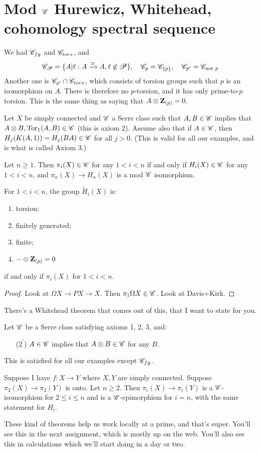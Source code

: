 \section{Mod $\mathscr C$ Hurewicz, Whitehead, cohomology spectral sequence}
We had $\mathscr C_{fg}$ and $\mathscr C_{tors}$, and
$$
\mathscr C_\mathscr P = \{A|\ell:A\xrightarrow{\simeq} A,\ell\not\in\mathscr P\},\quad \mathscr C_p = \mathscr C_{\{p\}},\quad \mathscr C_{p^\prime} = \mathscr C_{\text{not }p}
$$
Another one is $\mathscr C_{p^\prime}\cap \mathscr C_{tors}$, which consists of torsion groups such that $p$ is an isomorphism on $A$.
There is therefore no $p$-torsion, and it has only prime-to-$p$ torsion.
This is the same thing as saying that $A\otimes\mathbf Z_{(p)} = 0$.
\begin{theorem}
    Let $X$ be simply connected and $\mathscr C$ a Serre class such that $A,B\in\mathscr C$ implies that $A\otimes B,\operatorname{Tor}_1(A,B)\in \mathscr C$ (this is axiom 2).
    Assume also that if $A\in\mathscr C$, then $H_j(K(A,1)) = H_j(BA)\in\mathscr C$ for all $j>0$.
    (This is valid for all our examples, and is what is called Axiom 3.)

    Let $n\geq 1$.
    Then $\pi_i(X)\in\mathscr C$ for any $1<i<n$ if and only if $H_i(X)\in\mathscr C$ for any $1<i<n$,
    and $\pi_n(X)\to H_n(X)$ is a mod $\mathscr C$ isomorphism.
\end{theorem}
\begin{example}
    For $1<i<n$, the group $\widetilde{H}_i(X)$ is:
    \begin{enumerate}
	\item torsion;
	\item finitely generated;
	\item finite;
	\item $-\otimes \mathbf Z_{(p)} = 0$
    \end{enumerate}
    if and only if $\pi_i(X)$ for $1<i<n$.
\end{example}
\begin{proof}
    Look at $\Omega X\to PX \to X$.
    Then $\pi_1 \Omega X\in\mathscr C$.
    Look at Davis+Kirk.
\end{proof}
There's a Whitehead theorem that comes out of this, that I want to state for you.
\begin{theorem}
    Let $\mathscr C$ be a Serre class satisfying axioms 1, 2, 3, and:
    \begin{enumerate}
	\item[($2^\prime$)] $A\in\mathscr C$ implies that $A\otimes B\in\mathscr C$ for any $B$.
    \end{enumerate}
    This is satisfied for all our examples except $\mathscr C_{fg}$.

    Suppose I have $f:X\to Y$ where $X,Y$ are simply connected.
    Suppose $\pi_2(X)\to \pi_2(Y)$ is onto.
    Let $n\geq 2$.
    Then $\pi_i(X)\to \pi_i(Y)$ is a $\mathscr C$-isomorphism for $2\leq i\leq n$ and is a $\mathscr C$-epimorphism for $i=n$,
    with the same statement for $H_i$.
\end{theorem}
These kind of theorems help us work locally at a prime, and that's super.
You'll see this in the next assignment, which is mostly up on the web.
You'll also see this in calculations which we'll start doing in a day or two.

